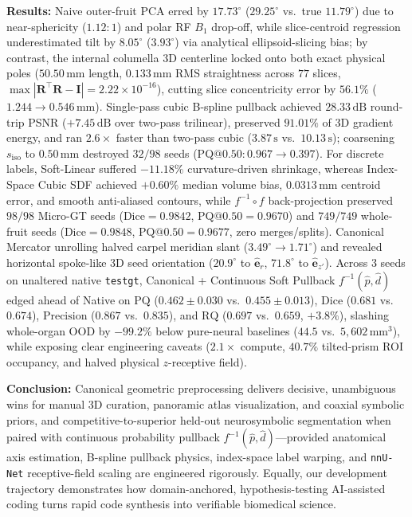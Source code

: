 \documentclass[10pt,a4paper]{article}
\renewcommand{\_}{\origunderscore\allowbreak}
\begin{document}
\begin{keybox}
\textbf{Results:} Naive outer-fruit PCA erred by $17.73^\circ$ ($29.25^\circ$ vs.\ true $11.79^\circ$) due to near-sphericity ($1.12:1$) and polar RF $B_1$ drop-off, while slice-centroid regression underestimated tilt by $8.05^\circ$ ($3.93^\circ$) via analytical ellipsoid-slicing bias; by contrast, the internal columella 3D centerline locked onto both exact physical poles ($50.50\,\text{mm}$ length, $0.133\,\text{mm}$ RMS straightness across $77$ slices, $\max|\mathbf{R}^\top\mathbf{R}-\mathbf{I}| = 2.22\times 10^{-16}$), cutting slice concentricity error by $56.1\%$ ($1.244 \to 0.546\,\text{mm}$). Single-pass cubic B-spline pullback achieved $28.33\,\text{dB}$ round-trip PSNR ($+7.45\,\text{dB}$ over two-pass trilinear), preserved $91.01\%$ of 3D gradient energy, and ran $2.6\times$ faster than two-pass cubic ($3.87\,\text{s}$ vs.\ $10.13\,\text{s}$); coarsening $s_{\text{iso}}$ to $0.50\,\text{mm}$ destroyed $32/98$ seeds ($\text{PQ@0.50}: 0.967 \to 0.397$). For discrete labels, Soft-Linear suffered $-11.18\%$ curvature-driven shrinkage, whereas Index-Space Cubic SDF achieved $+0.60\%$ median volume bias, $0.0313\,\text{mm}$ centroid error, and smooth anti-aliased contours, while $f^{-1}\circ f$ back-projection preserved $98/98$ Micro-GT seeds ($\text{Dice}=0.9842$, $\text{PQ@0.50}=0.9670$) and $749/749$ whole-fruit seeds ($\text{Dice}=0.9848$, $\text{PQ@0.50}=0.9677$, zero merges/splits). Canonical Mercator unrolling halved carpel meridian slant ($3.49^\circ \to 1.71^\circ$) and revealed horizontal spoke-like 3D seed orientation ($20.9^\circ$ to $\hat{\mathbf{e}}_r$, $71.8^\circ$ to $\hat{\mathbf{e}}_{z'}$). Across 3 seeds on unaltered native \texttt{test\_gt}, Canonical + Continuous Soft Pullback $f^{-1}(\hat{p},\hat{d})$ edged ahead of Native on $\text{PQ}$ ($0.462 \pm 0.030$ vs.\ $0.455 \pm 0.013$), $\text{Dice}$ ($0.681$ vs.\ $0.674$), $\text{Precision}$ ($0.867$ vs.\ $0.835$), and $\text{RQ}$ ($0.697$ vs.\ $0.659$, $+3.8\%$), slashing whole-organ OOD by $-99.2\%$ below pure-neural baselines ($44.5$ vs.\ $5{,}602\,\text{mm}^3$), while exposing clear engineering caveats ($2.1\times$ compute, $40.7\%$ tilted-prism ROI occupancy, and halved physical $z$-receptive field).

\textbf{Conclusion:} Canonical geometric preprocessing delivers decisive, unambiguous wins for manual 3D curation, panoramic atlas visualization, and coaxial symbolic priors, and competitive-to-superior held-out neurosymbolic segmentation when paired with continuous probability pullback $f^{-1}(\hat{p},\hat{d})$---provided anatomical axis estimation, B-spline pullback physics, index-space label warping, and \texttt{nnU-Net} receptive-field scaling are engineered rigorously. Equally, our development trajectory demonstrates how domain-anchored, hypothesis-testing AI-assisted coding turns rapid code synthesis into verifiable biomedical science.
\end{keybox}
\end{document}
